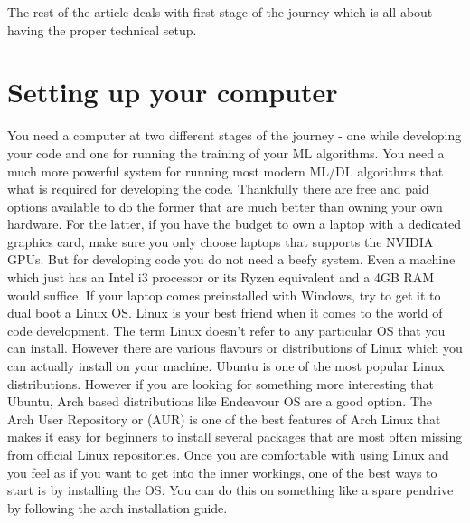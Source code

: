 \documentclass{../template/texnote}
\begin{document}
The rest of the article deals with first stage of the journey which is all about having the proper technical setup. 
    
\section{Setting up your computer}
You need a computer at two different stages of the journey - one while developing your code and one for running the training of your ML algorithms. You need a much more powerful system for running most modern ML/DL algorithms that what is required for developing the code. Thankfully there are free and paid options available to do the former that are much better than owning your own hardware. For the latter, if you have the budget to own a laptop with a dedicated graphics card, make sure you only choose laptops that supports the NVIDIA GPUs. But for developing code you do not need a beefy system. Even a machine which just has an Intel i3 processor or its Ryzen equivalent and a 4GB RAM would suffice. If your laptop comes preinstalled with Windows, try to get it to dual boot a Linux OS. Linux is your best friend when it comes to the world of code development. The term Linux doesn't refer to any particular OS that you can install. However there are various flavours or distributions of Linux which you can actually install on your machine. Ubuntu is one of the most popular Linux distributions. However if you are looking for something more interesting that Ubuntu, Arch based distributions like Endeavour OS are a good option. The Arch User Repository or (AUR) is one of the best features of Arch Linux that makes it easy for beginners to install several packages that are most often missing from official Linux repositories. Once you are comfortable with using Linux and you feel as if you want to get into the inner workings, one of the best ways to start is by installing the \cite{archlinux} OS. You can do this on something like a spare pendrive by following the arch installation guide. 
\end{document}
